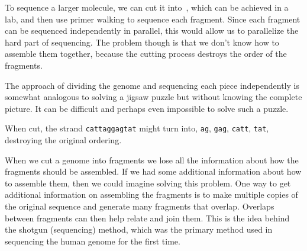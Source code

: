 \begin{cluster}
\label{grp:grm:genome::fragments}

\begin{gram}[Fragments]
\label{grm:genome::fragments}
To sequence a larger molecule, we can cut it into~,
which can be achieved in a lab, and then use primer walking to sequence
each fragment.
Since each fragment can be sequenced independently in parallel, this
would allow us to parallelize the hard part of sequencing.
The problem though is that we don't know how to assemble them
together, because the cutting process destroys the order of the
fragments.

\end{gram}
\end{cluster}

\begin{cluster}
\label{grp:nt:genome::approach}

\begin{note}
\label{nt:genome::approach}
The approach of dividing the genome and sequencing each piece
independently is somewhat analogous to solving a jigsaw puzzle but
without knowing the complete picture.
It can be difficult and perhaps even impossible to solve such a
puzzle.

\end{note}
\end{cluster}

\begin{cluster}
\label{grp:xmpl:genome::strand}

\begin{example}
\label{xmpl:genome::strand}
When cut, the strand \texttt{cattaggagtat} might turn into,
\texttt{ag}, \texttt{gag}, \texttt{catt}, \texttt{tat}, destroying the
original ordering.

\end{example}
\end{cluster}

\begin{cluster}
\label{grp:grm:genome::the-shotgun-method}

\begin{gram}
\label{grm:genome::the-shotgun-method}
When we cut a genome into fragments we lose all the information
about how the fragments should be assembled.
If we had some additional information about how to assemble them, then
we could imagine solving this problem.
One way to get additional information on assembling the fragments is
to make multiple copies of the original sequence and generate many
fragments that overlap.
Overlaps between fragments can then help relate and join them.
This is the idea behind the shotgun (sequencing) method, which was the
primary method used in sequencing the human genome for the first time.

\end{gram}
\end{cluster}

